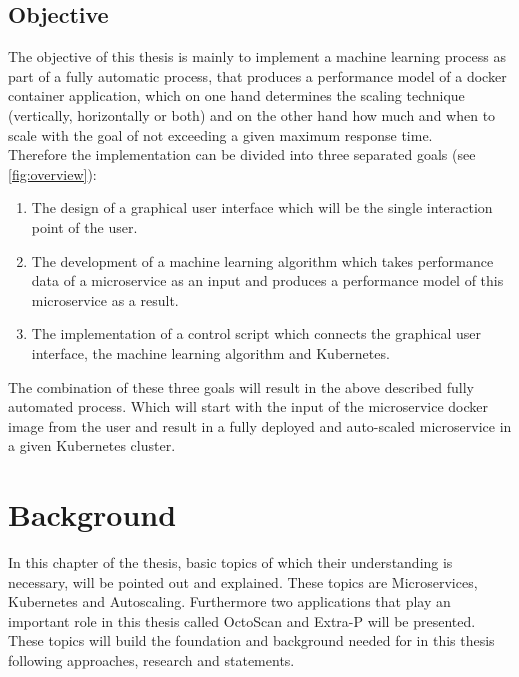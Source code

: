 \documentclass[
	ngerman,
	ruledheaders=section,%
	class=report,%
	thesis={type=master},%
	accentcolor=8c,%
	custommargins=false,%
	marginpar=false,%
	parskip=half-,%
	fontsize=11pt,%
]{tudapub}
\begin{document}
\section{Objective}
The objective of this thesis is mainly to implement a machine learning process as part of a fully
automatic process, that produces a performance model of a docker container application, which
on one hand determines the scaling technique (vertically, horizontally or both) and on the other
hand how much and when to scale with the goal of not exceeding a given maximum response time.\\
Therefore the implementation can be divided into three separated goals (see \ref{fig:overview}):
\begin{enumerate}
\item The design of a graphical user interface which will be the single interaction point of the user. 
\item The development of a machine learning algorithm which takes performance data of a microservice as an input and produces a performance model of this microservice as a result. 
\item The implementation of a control script which connects the graphical user interface, the machine learning algorithm and Kubernetes. 
\end{enumerate}

The combination of these three goals will result in the above described fully automated process. Which will start with the input of the microservice docker image from the user and result in a fully deployed and auto-scaled microservice in a given Kubernetes cluster.
\newpage
\chapter{Background}
In this chapter of the thesis, basic topics of which their understanding is necessary, will be pointed out and explained. These topics are Microservices, Kubernetes and Autoscaling. Furthermore two applications that play an important role in this thesis called OctoScan and Extra-P will be presented. These topics will build the foundation and background needed for in this thesis following approaches, research and statements.
\end{document}
